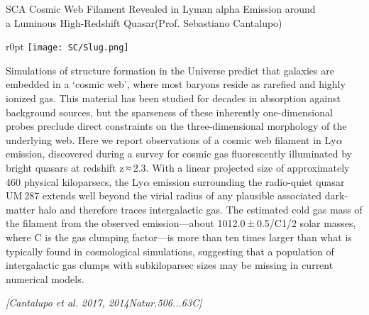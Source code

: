 \begin{section}{SC}{A Cosmic Web Filament Revealed in Lyman alpha Emission around \\
    \hspace*{4cm} a Luminous High-Redshift Quasar}{(Prof. Sebastiano Cantalupo)}
  \begin{minipage}{\linewidth}
    \begin{wrapfigure}{r}{0pt}
      \texttt{[image: SC/Slug.png]}
    \end{wrapfigure}
    \strut {\small Simulations of structure formation in the Universe
      predict that galaxies are embedded in a ‘cosmic web’, where most
      baryons reside as rarefied and highly ionized gas. This material has
      been studied for decades in absorption against background sources,
      but the sparseness of these inherently one-dimensional probes preclude
      direct constraints on the three-dimensional morphology of the
      underlying web. Here we report observations of a cosmic web filament
      in Ly$\alpha$ emission, discovered during a survey for cosmic gas
      fluorescently illuminated by bright quasars at redshift z ≈ 2.3.
      With a linear projected size of approximately 460 physical
      kiloparsecs, the Ly$\alpha$ emission surrounding the radio-quiet quasar
      UM 287 extends well beyond the virial radius of any plausible
      associated dark-matter halo and therefore traces intergalactic gas.
      The estimated cold gas mass of the filament from the observed
      emission—about 1012.0 ± 0.5/C1/2 solar masses, where C is the gas
      clumping factor—is more than ten times larger than what is typically
      found in cosmological simulations, suggesting that a population of
      intergalactic gas clumps with subkiloparsec sizes may be missing in
      current numerical models.}
  \end{minipage}

  \vspace{0.7cm}

  {\footnotesize \textit{[Cantalupo et al. 2017, 2014Natur.506...63C]}}
\end{section}